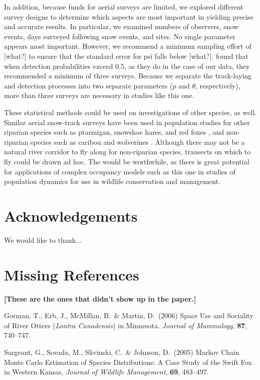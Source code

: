 \documentclass[11pt]{article}
\begin{document}
In addition, because funds for aerial surveys are limited, we explored
different survey designs to determine which aspects are most important in
yielding precise and accurate results. In particular, we examined numbers of
observers, snow events, days surveyed following snow events, and sites. No
single parameter appears most important. However, we recommend a minimum
sampling effort of [what?] to ensure that the standard error for psi falls
below [what?]. \citet{Mackenzie2005} found that when detection probabilities
exceed 0.5, as they do in the case of our data, they recommended a minimum of
three surveys. Because we separate the track-laying and detection processes
into two separate parameters ($p$ and $\theta$, respectively), more than three
surveys are necessary in studies like this one.

These statistical methods could be used on investigations of other species, as
well. Similar aerial snow-track surveys have been used in population studies
for other riparian species such as ptarmigan, snowshoe hares, and red foxes
\citep{St-Georges1995}, and non-riparian species such as caribou
\citep{Courtois2003} and wolverines \citep{Magoun2007}. Although there may not
be a natural river corridor to fly along for non-riparian species, transects on
which to fly could be drawn ad hoc. The would be worthwhile, as there is great
potential for applications of complex occupancy models such as this one in
studies of population dynamics for use in wildlife conservation and management.

\section{Acknowledgements}

We would like to thank...




\section{Missing References}
\noindent

\textbf{[These are the ones that didn't show up in the paper.]}

\leftskip 0.15in

\parindent -0.15in
Gorman, T., Erb, J., McMillan, B.\ \& Martin, D.\ (2006) Space Use and
Sociality of River Otters ({\em Lontra Canadensis}) in Minnesota. {\em Journal
of Mammalogy}, {\bf 87}, 740--747.

\parindent -0.15in
Sargeant, G., Sovada, M., Slivinski, C.\ \& Johnson, D.\ (2005) Markov Chain
Monte Carlo Estimation of Species Distributions: A Case Study of the Swift Fox
in Western Kansas, {\em Journal of Wildlife Management}, {\bf 69}, 483--497.
\end{document}
